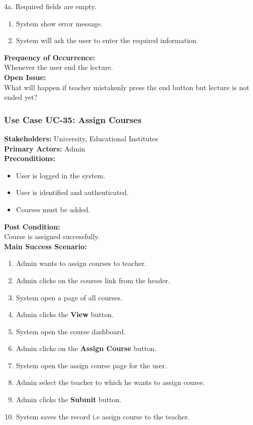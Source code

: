 \documentclass[12pt]{article}
\begin{document}
4a. Required fields are empty.
\begin{enumerate}
\item System show error message.
\item System will ask the user to enter the required information.
\end{enumerate}
\textbf{Frequency of Occurrence:}\\
Whenever the user end the lecture.\\
\textbf{Open Issue:}\\
What will happen if teacher mistakenly press the end button but lecture is not ended yet?



\subsubsection{Use Case UC-35: Assign Courses}
\textbf{Stakeholders: } University, Educational Institutes \\
\textbf{Primary Actors: }Admin\\
\textbf{Preconditions:}
\begin{itemize}
\item User is logged in the system.
\item User is identified and authenticated.
\item Courses must be added.
\end{itemize}
\textbf{Post Condition: }\\
Course is assigned successfully.\\
\newpage
\textbf{Main Success Scenario:}
\begin{enumerate}
\item Admin wants to assign courses to teacher.
\item Admin clicks on the courses link from the header.
\item System open a page of all courses.
\item Admin clicks the \textbf{View} button.
\item System open the course dashboard.
\item Admin clicks on the \textbf{Assign Course} button.
\item System open the assign course page for the user.
\item Admin select the teacher to which he wants to assign course.
\item Admin clicks the \textbf{Submit} button.
\item System saves the record i.e assign course to the teacher.
\end{enumerate}
\end{document}
